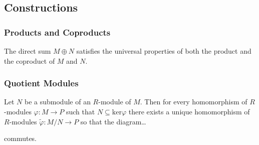 \subsection{Constructions}\label{rmoduleconstructions}

\subsubsection{Products and Coproducts}\label{moduleproducts}

\begin{proposition}
The direct sum $M \oplus N$ satisfies the universal properties of both the product and the coproduct of $M$ and $N$.
\end{proposition}

\subsubsection{Quotient Modules}\label{modulequotients}
\begin{theorem}
\label{quotientrmodulethm}
Let $N$ be a submodule of an $R$-module of $M$. Then for every homomorphism of $R$-modules
$\varphi : M \rightarrow P$ such that $N \subseteq \textrm{ker} \varphi$ there exists a unique
homomorphism of $R$-modules $\tilde \varphi : M/N \rightarrow P$ so that the diagram\dots
\begin{figure}[H]
\centering

\end{figure}
\noindent commutes.
\end{theorem}